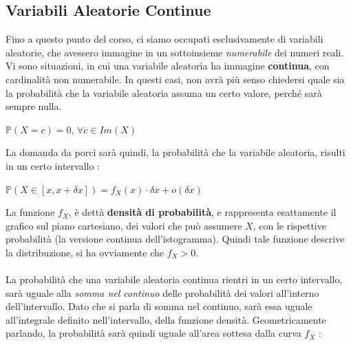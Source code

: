\documentclass[12pt, letterpaper]{article}
\newcommand{\acc}{\\\hphantom{}\\}
\newcommand{\Prob}{{\mathbb P}}
\begin{document}
\subsection{Variabili Aleatorie Continue}
Fino a questo punto del corso, ci siamo occupati esclusivamente di variabili aleatorie, che avessero immagine 
in un sottoinsieme \textit{numerabile} dei numeri reali. Vi sono situazioni, in cui una variabile aleatoria 
ha immagine \textbf{continua}, con cardinalità non numerabile. In questi casi, non avrà più senso chiedersi quale sia 
la probabilità che la variabile aleatoria assuma un certo valore, perché sarà sempre nulla. 
\begin{center}
    \(\Prob(X=c)=0\), \(\forall c\in Im(X)\)
\end{center}
La domanda da porci sarà quindi, la probabilità che la variabile aleatoria, risulti in un certo 
intervallo : \begin{center}
    \(\Prob(X\in[x,x+\delta x])=f_X(x)\cdot \delta x+o(\delta x)\)
\end{center}
La funzione \(f_X\), è dettà \textbf{densità di probabilità}, e rappresenta esattamente il grafico 
sul piano cartesiano, dei valori che può assumere \(X\), con le rispettive probabilità (la versione 
continua dell'istogramma). Quindi tale funzione descrive la distribuzione, si ha ovviamente che \(f_X>0\).\acc 
La probabilità che una variabile aleatoria continua rientri in un certo intervallo, sarà uguale alla \textit{somma 
nel continuo} delle probabilità dei valori all'interno dell'intervallo. Dato che si parla di somma nel continuo, 
sarà essa uguale all'integrale definito nell'intervallo, della funzione densità. Geometricamente 
parlando, la probabilità sarà quindi 
uguale all'area sottesa dalla curva \(f_X\) :
\begin{figure}[h]
\end{figure}
\end{document}
